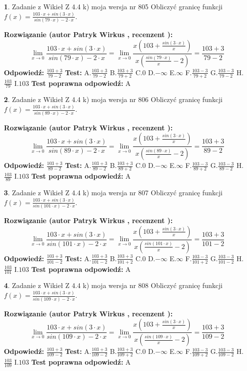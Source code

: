 \documentclass[12pt, a4paper]{article}
\theoremstyle{definition} %
\newtheorem{zad}{}
\newcommand{\zadStart}[1]{\begin{zad}#1\newline}
\newcommand{\zadStop}{\end{zad}}
\newcommand{\rozwStart}[2]{\noindent \textbf{Rozwiązanie (autor #1 , recenzent #2): }\newline}
\newcommand{\rozwStop}{\newline}
\newcommand{\odpStart}{\noindent \textbf{Odpowiedź:}\newline}
\newcommand{\odpStop}{\newline}
\newcommand{\testStart}{\noindent \textbf{Test:}\newline}
\newcommand{\testStop}{\newline}
\newcommand{\kluczStart}{\noindent \textbf{Test poprawna odpowiedź:}\newline}
\newcommand{\kluczStop}{\newline}
\begin{document}
\zadStart{Zadanie z Wikieł Z 4.4 k) moja wersja nr 805}
Obliczyć granicę funkcji $f(x)=\frac{103\cdot x +sin(3\cdot x)}{sin(79\cdot x) -2\cdot x}$.
\zadStop
\rozwStart{Patryk Wirkus}{}
$$\lim\limits_{x\to 0}\frac{103\cdot x +sin(3\cdot x)}{sin(79\cdot x) -2\cdot x}
=\lim\limits_{x\to 0}\frac{x(103+\frac{sin(3\cdot x)}{x})}{x(\frac{sin(79\cdot x)}{x}-2)}
=\frac{103+3}{79-2}$$
\rozwStop
\odpStart
$\frac{103+3}{79-2}$
\odpStop
\testStart
A.$\frac{103+3}{79-2}$
B.$\frac{103+3}{79+2}$
C.$0$
D.$-\infty$
E.$\infty$
F.$\frac{103-3}{79+2}$
G.$\frac{103-3}{79-2}$
H.$\frac{103}{79}$
I.$103$
\testStop
\kluczStart
A
\kluczStop



\zadStart{Zadanie z Wikieł Z 4.4 k) moja wersja nr 806}
Obliczyć granicę funkcji $f(x)=\frac{103\cdot x +sin(3\cdot x)}{sin(89\cdot x) -2\cdot x}$.
\zadStop
\rozwStart{Patryk Wirkus}{}
$$\lim\limits_{x\to 0}\frac{103\cdot x +sin(3\cdot x)}{sin(89\cdot x) -2\cdot x}
=\lim\limits_{x\to 0}\frac{x(103+\frac{sin(3\cdot x)}{x})}{x(\frac{sin(89\cdot x)}{x}-2)}
=\frac{103+3}{89-2}$$
\rozwStop
\odpStart
$\frac{103+3}{89-2}$
\odpStop
\testStart
A.$\frac{103+3}{89-2}$
B.$\frac{103+3}{89+2}$
C.$0$
D.$-\infty$
E.$\infty$
F.$\frac{103-3}{89+2}$
G.$\frac{103-3}{89-2}$
H.$\frac{103}{89}$
I.$103$
\testStop
\kluczStart
A
\kluczStop



\zadStart{Zadanie z Wikieł Z 4.4 k) moja wersja nr 807}
Obliczyć granicę funkcji $f(x)=\frac{103\cdot x +sin(3\cdot x)}{sin(101\cdot x) -2\cdot x}$.
\zadStop
\rozwStart{Patryk Wirkus}{}
$$\lim\limits_{x\to 0}\frac{103\cdot x +sin(3\cdot x)}{sin(101\cdot x) -2\cdot x}
=\lim\limits_{x\to 0}\frac{x(103+\frac{sin(3\cdot x)}{x})}{x(\frac{sin(101\cdot x)}{x}-2)}
=\frac{103+3}{101-2}$$
\rozwStop
\odpStart
$\frac{103+3}{101-2}$
\odpStop
\testStart
A.$\frac{103+3}{101-2}$
B.$\frac{103+3}{101+2}$
C.$0$
D.$-\infty$
E.$\infty$
F.$\frac{103-3}{101+2}$
G.$\frac{103-3}{101-2}$
H.$\frac{103}{101}$
I.$103$
\testStop
\kluczStart
A
\kluczStop



\zadStart{Zadanie z Wikieł Z 4.4 k) moja wersja nr 808}
Obliczyć granicę funkcji $f(x)=\frac{103\cdot x +sin(3\cdot x)}{sin(109\cdot x) -2\cdot x}$.
\zadStop
\rozwStart{Patryk Wirkus}{}
$$\lim\limits_{x\to 0}\frac{103\cdot x +sin(3\cdot x)}{sin(109\cdot x) -2\cdot x}
=\lim\limits_{x\to 0}\frac{x(103+\frac{sin(3\cdot x)}{x})}{x(\frac{sin(109\cdot x)}{x}-2)}
=\frac{103+3}{109-2}$$
\rozwStop
\odpStart
$\frac{103+3}{109-2}$
\odpStop
\testStart
A.$\frac{103+3}{109-2}$
B.$\frac{103+3}{109+2}$
C.$0$
D.$-\infty$
E.$\infty$
F.$\frac{103-3}{109+2}$
G.$\frac{103-3}{109-2}$
H.$\frac{103}{109}$
I.$103$
\testStop
\kluczStart
A
\kluczStop
\end{document}
